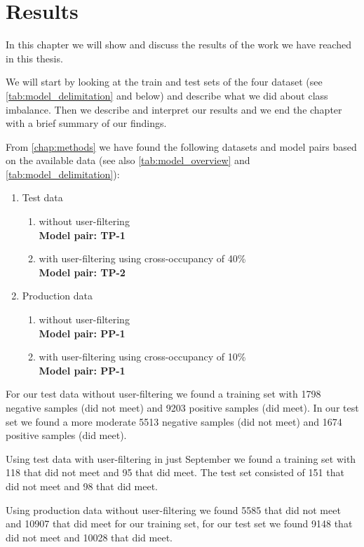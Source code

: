 \chapter{Results}
\label{chap:results}
In this chapter we will show and discuss the results of the work we have reached in this thesis.

We will start by looking at the train and test sets of the four dataset (see \autoref{tab:model_delimitation} and below) and describe what we did about class imbalance. Then we describe and interpret our results and we end the chapter with a brief summary of our findings. 

From \autoref{chap:methods} we have found the following datasets and model pairs based on the available data (see also \autoref{tab:model_overview} and \autoref{tab:model_delimitation}):
\begin{enumerate}
\item Test data
\begin{enumerate}
\item without user-filtering \\\textbf{Model pair: TP-1}
\item with user-filtering using cross-occupancy of 40\% \\\textbf{Model pair: TP-2}
\end{enumerate}
\item Production data
\begin{enumerate}
\item without user-filtering \\\textbf{Model pair: PP-1}
\item with user-filtering using cross-occupancy of 10\% \\\textbf{Model pair: PP-1}
\end{enumerate}
\end{enumerate}


For our test data without user-filtering we found a training set with 1798 negative samples (did not meet) and 9203 positive samples (did meet). In our test set we found a more moderate 5513 negative samples (did not meet) and 1674 positive samples (did meet).

Using test data with user-filtering in just September we found a training set with 118 that did not meet and 95 that did meet. The test set consisted of 151 that did not meet and 98 that did meet. 

Using production data without user-filtering we found 5585 that did not meet and 10907 that did meet for our training set, for our test set we found 9148 that did not meet and 10028 that did meet.

